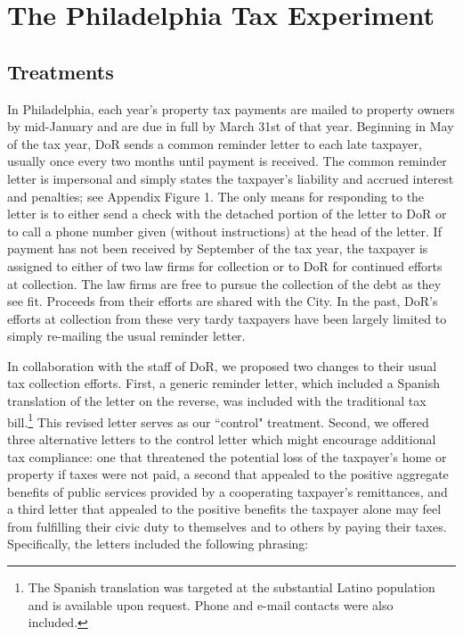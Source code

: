 \documentclass[12pt,titlepage]{article}
\begin{document}
\section{The Philadelphia Tax Experiment}

\subsection{Treatments}

In Philadelphia, each year's property tax payments are mailed to
property owners by mid-January and are due in full by March 31st of
that year.  Beginning in May of the tax year, DoR sends a common
reminder letter to each late taxpayer, usually once every two months
until payment is received.  The common reminder letter is impersonal
and simply states the taxpayer's liability and accrued interest and
penalties; see Appendix Figure 1.  The only means for responding to the letter
is to either send a check with the detached portion of the letter to
DoR or to call a phone number given (without instructions) at the head of the letter.
If payment has not been received by September
of the tax year, the taxpayer is assigned
to either of two law firms for collection or to DoR
for continued efforts at collection.  The law firms are free to pursue
the collection of the debt as they see fit.  Proceeds from their
efforts are shared with the City.  In the past, DoR's efforts at
collection from these very tardy taxpayers have been largely limited to simply
re-mailing the usual reminder letter.

In collaboration with the staff of DoR, we proposed two changes to
their usual tax collection efforts.  First, a generic reminder letter,
which included a Spanish translation of the letter on the reverse,
was included with the traditional tax
bill.\footnote{The Spanish translation was targeted at the substantial
  Latino population and is available upon request. Phone and e-mail contacts were
  also included.}  This revised letter serves as our ``control"
treatment.  Second, we offered three alternative letters to the
control letter which might encourage additional tax compliance: one
that threatened the potential loss of the taxpayer's home or property
if taxes were not paid, a second that appealed to the positive
aggregate benefits of public services provided by a cooperating
taxpayer's remittances, and a third letter that appealed to the
positive benefits the taxpayer alone may feel from fulfilling their
civic duty to themselves and to others by paying their
taxes. Specifically, the letters included the following phrasing:
\end{document}
